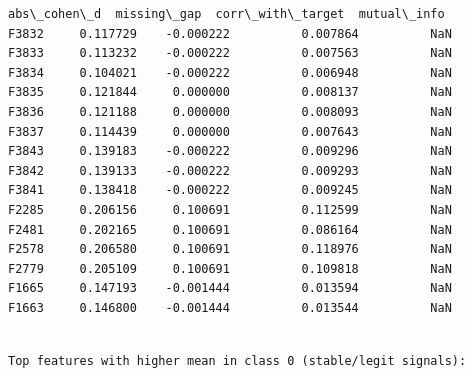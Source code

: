 \documentclass[11pt]{article}
\begin{document}
\begin{Verbatim}[commandchars=\\\{\}]
       abs\_cohen\_d  missing\_gap  corr\_with\_target  mutual\_info  
F3832     0.117729    -0.000222          0.007864          NaN  
F3833     0.113232    -0.000222          0.007563          NaN  
F3834     0.104021    -0.000222          0.006948          NaN  
F3835     0.121844     0.000000          0.008137          NaN  
F3836     0.121188     0.000000          0.008093          NaN  
F3837     0.114439     0.000000          0.007643          NaN  
F3843     0.139183    -0.000222          0.009296          NaN  
F3842     0.139133    -0.000222          0.009293          NaN  
F3841     0.138418    -0.000222          0.009245          NaN  
F2285     0.206156     0.100691          0.112599          NaN  
F2481     0.202165     0.100691          0.086164          NaN  
F2578     0.206580     0.100691          0.118976          NaN  
F2779     0.205109     0.100691          0.109818          NaN  
F1665     0.147193    -0.001444          0.013594          NaN  
F1663     0.146800    -0.001444          0.013544          NaN  
    \end{Verbatim}

    
    \begin{Verbatim}[commandchars=\\\{\}]

Top features with higher mean in class 0 (stable/legit signals):
    \end{Verbatim}
\end{document}
